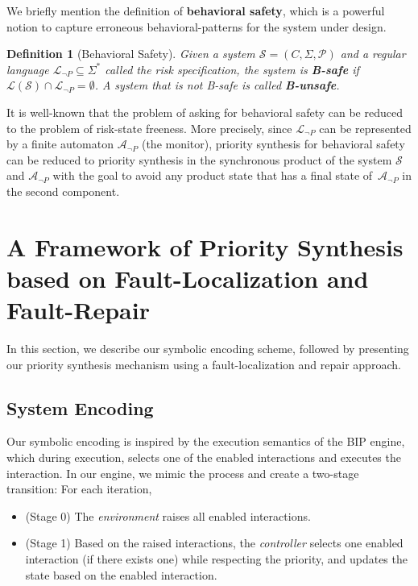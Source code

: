\documentclass[10pt, a4paper, onecolumn, conference, compsocconf]{IEEEtran}
\newcommand{\system}{\mathcal{S}}
\newcommand{\lang}{\mathcal{L}(\system)\xspace}
\newtheorem{defi}{Definition}
\begin{document}
We briefly mention the definition of \textbf{behavioral safety}, which is a powerful notion to capture erroneous behavioral-patterns
for the system under design.
\begin{defi}[Behavioral Safety]
  Given a system $\mathcal{S} = (C , \Sigma, \mathcal{P})$ and a regular language $\mathcal{L}_{\neg P} \subseteq \Sigma^{*}$ called the \emph{risk specification}, the system is \textbf{B-safe} if $\lang \cap \mathcal{L}_{\neg P} = \emptyset$. A system that is not B-safe is called \textbf{B-unsafe}.
\end{defi}

It is well-known that the problem of asking for behavioral safety can be reduced to the problem of risk-state freeness.
More precisely, since $\mathcal{L}_{\neg P}$ can be represented by a finite automaton $\mathcal{A}_{\neg P}$ (the monitor), priority synthesis for behavioral safety can be reduced to priority synthesis in the synchronous product of the system $\mathcal{S}$ and $\mathcal{A}_{\neg P}$ with the goal to avoid any product state that has a final state of~$\mathcal{A}_{\neg P}$ in the second component.


\section{A Framework of Priority Synthesis based on Fault-Localization and Fault-Repair\label{sec.algo.prioritysyn.repair}}


In this section, we describe our symbolic encoding scheme, followed by presenting our priority synthesis mechanism
using a fault-localization and repair approach.

\subsection{System Encoding\label{subsec.algo.prioritysyn.encoding}}

\newcommand{\enc}{enc}


Our symbolic encoding is inspired by the execution semantics of the BIP engine, which
during execution, selects one of the enabled interactions and executes the interaction.
In our engine, we mimic the process and create a two-stage transition: For each iteration,

\begin{itemize}
    \item (Stage 0) The \emph{environment} raises all enabled interactions.
    \item (Stage 1) Based on the raised interactions, the \emph{controller} selects one enabled interaction (if there exists one) while respecting the priority, and updates the state based on the enabled interaction.
\end{itemize}
\end{document}
